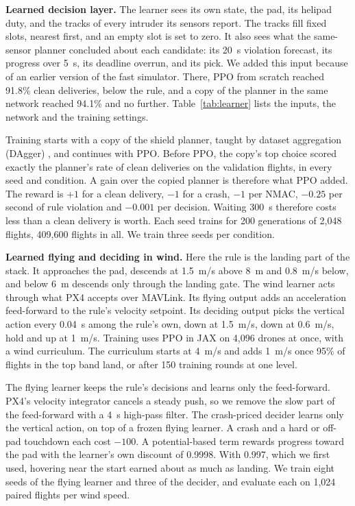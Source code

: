 \textbf{Learned decision layer.} The learner sees its own state, the pad, its helipad duty, and the tracks of every intruder its sensors report. The tracks fill fixed slots, nearest first, and an empty slot is set to zero. It also sees what the same-sensor planner concluded about each candidate: its 20~s violation forecast, its progress over 5~s, its deadline overrun, and its pick. We added this input because of an earlier version of the fast simulator. There, PPO from scratch reached 91.8\% clean deliveries, below the rule, and a copy of the planner in the same network reached 94.1\% and no further. Table~\ref{tab:learner} lists the inputs, the network and the training settings.

Training starts with a copy of the shield planner, taught by dataset aggregation (DAgger) \cite{ross2011}, and continues with PPO. Before PPO, the copy's top choice scored exactly the planner's rate of clean deliveries on the validation flights, in every seed and condition. A gain over the copied planner is therefore what PPO added. The reward is $+1$ for a clean delivery, $-1$ for a crash, $-1$ per NMAC, $-0.25$ per second of rule violation and $-0.001$ per decision. Waiting 300~s therefore costs less than a clean delivery is worth. Each seed trains for 200 generations of 2,048 flights, 409,600 flights in all. We train three seeds per condition.



\textbf{Learned flying and deciding in wind.} Here the rule is the landing part of the stack. It approaches the pad, descends at 1.5~m/s above 8~m and 0.8~m/s below, and below 6~m descends only through the landing gate. The wind learner acts through what PX4 accepts over MAVLink. Its flying output adds an acceleration feed-forward to the rule's velocity setpoint. Its deciding output picks the vertical action every 0.04~s among the rule's own, down at 1.5~m/s, down at 0.6~m/s, hold and up at 1~m/s. Training uses PPO in JAX on 4,096 drones at once, with a wind curriculum. The curriculum starts at 4~m/s and adds 1~m/s once 95\% of flights in the top band land, or after 150 training rounds at one level.

The flying learner keeps the rule's decisions and learns only the feed-forward. PX4's velocity integrator cancels a steady push, so we remove the slow part of the feed-forward with a 4~s high-pass filter. The crash-priced decider learns only the vertical action, on top of a frozen flying learner. A crash and a hard or off-pad touchdown each cost $-100$. A potential-based term rewards progress toward the pad with the learner's own discount of 0.9998. With 0.997, which we first used, hovering near the start earned about as much as landing. We train eight seeds of the flying learner and three of the decider, and evaluate each on 1,024 paired flights per wind speed.

